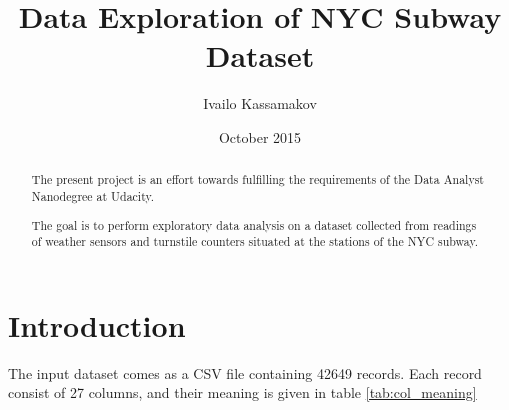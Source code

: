 \documentclass{article}
\title{Data Exploration of NYC Subway Dataset}
\author{Ivailo Kassamakov}
\date{October 2015}
\begin{document}
\maketitle
\begin{abstract}
The present project is an effort towards fulfilling the requirements of the Data Analyst Nanodegree at Udacity.

The goal is to perform exploratory data analysis on a dataset collected from readings of weather sensors and turnstile counters situated at the stations of the NYC subway.
\end{abstract}

\section{Introduction}

The input dataset comes as a CSV file containing 42649 records. Each record consist of 27 columns, and their meaning is given in table \ref{tab:col_meaning}
\end{document}
